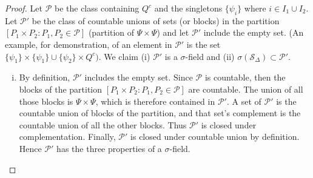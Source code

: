 \documentclass[letterpaper, 12pt]{article}
\newcommand{\cP}{\mathcal{P}}
\newcommand{\cS}{\mathcal{S}}
\begin{document}
\begin{enumerate}
\begin{proof}
Let $\cP$ be the class containing $Q^c$ and the singletons $\{\psi_i\}$ where $i \in I_1 \cup I_2$. 
Let $\cP'$ be the class of countable unions of sets (or blocks) in the partition $[P_1 \times P_2 : P_1, P_2 \in \cP]$ (partition of $\Psi \times \Psi$) and let $\cP'$ include the empty set.
(An example, for demonstration, of an element in $\cP'$ is the set $\{\psi_1\} \times \{\psi_1\} \cup \{\psi_2\} \times Q^c)$. 
We claim (i) $\cP'$ is a $\sigma$-field and (ii) $\sigma(\cS_\Delta) \subset \cP'$.
\begin{enumerate}[(i)]
\item
By definition, $\cP'$ includes the empty set. 
Since $\cP$ is countable, then the blocks of the partition $[P_1 \times P_2 : P_1, P_2 \in \cP]$ are countable. 
The union of all those blocks is $\Psi \times \Psi$, which is therefore contained in $\cP'$. 
A set of $\cP'$ is the countable union of blocks of the partition, and that set's complement is the countable union of all the other blocks. 
Thus $\cP'$ is closed under complementation.
Finally, $\cP'$ is closed under countable union by definition. 
Hence $\cP'$ has the three properties of a $\sigma$-field.


\end{enumerate}
\end{proof}
\end{enumerate}
\end{document}
